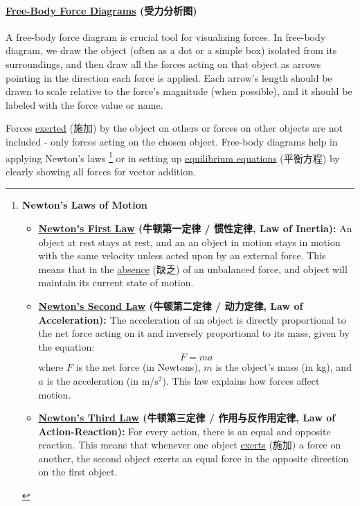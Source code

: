 \paragraph{\underline{Free-Body Force Diagrams} (受力分析图)}
A free-body force diagram is crucial tool for visualizing forces. In free-body diagram, we draw the object (often as a dot or a
simple box) isolated from its surroundings, and then draw all the forces acting on that object as arrows pointing in the
direction each force is applied. Each arrow's length should be drawn to scale relative to the force's magnitude (when possible),
and it should be labeled with the force value or name. \par
Forces \underline{exerted} (施加) by the object on others or forces on other objects are not included - only forces acting on the
chosen object. Free-body diagrams help in applying Newton's laws \footnote{\textbf{Newton's Laws of Motion}
\begin{itemize}
    \item \textbf{\underline{Newton's First Law} (牛顿第一定律 / 惯性定律, Law of Inertia):} An object at rest stays at rest, and an
    an object in motion stays in motion with the same velocity unless acted upon by an external force. This means that in the
    \underline{absence} (缺乏) of an unbalanced force, and object will maintain its current state of motion.
    \item \textbf{\underline{Newton's Second Law} (牛顿第二定律 / 动力定律, Law of Acceleration):} The acceleration of an object is
    directly proportional to the net force acting on it and inversely proportional to its mass, given by the equation:
    \begin{equation*}
        F = ma
    \end{equation*}
    where $F$ is the net force (in Newtons), $m$ is the object's mass (in kg), and $a$ is the acceleration (in m/$\text{s}^2$).
    This law explains how forces affect motion.
    \item \textbf{\underline{Newton's Third Law} (牛顿第三定律 / 作用与反作用定律, Law of Action-Reaction):} For every action, there
    is an equal and opposite reaction. This means that whenever one object \underline{exerts} (施加) a force on another, the
    second object exerts an equal force in the opposite direction on the first object.
\end{itemize}} or in setting up \underline{equilibrium equations} (平衡方程) by clearly showing all forces for vector addition.
